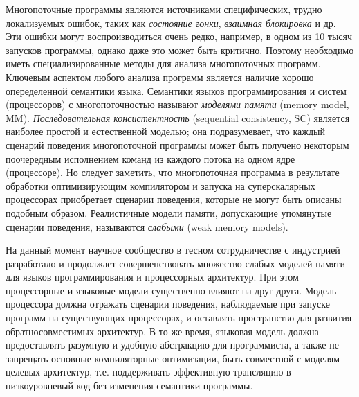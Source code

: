 
{\actuality}
Многопоточные программы являются источниками специфических,
трудно локализуемых ошибок,
таких как \emph{состояние гонки}, \emph{взаимная блокировка} и др.
Эти ошибки могут воспроизводиться очень редко, например, в одном из 10 тысяч запусков
программы, однако даже это может быть критично.
Поэтому необходимо иметь специализированные методы для анализа многопоточных программ.
Ключевым аспектом любого анализа программ является наличие хорошо опеределенной семантики языка.
Семантики языков программирования и систем (процессоров) с многопоточностью называют \emph{моделями памяти} (memory model, MM).
\emph{Последовательная консистентность} (sequential consistency, SC) является наиболее простой и естественной моделью;
она подразумевает, что каждый сценарий поведения многопоточной программы может быть
получено некоторым поочередным исполнением команд из каждого потока на одном ядре
(процессоре). Но следует заметить, что многопоточная программа в результате обработки оптимизирующим
компилятором и запуска на суперскалярных процессорах приобретает сценарии поведения,
которые не могут быть описаны подобным образом.
Реалистичные модели памяти, допускающие упомянутые сценарии поведения, называются \emph{слабыми} (weak memory models).

На данный момент научное сообщество в тесном сотрудничестве с индустрией
разработало и продолжает совершенствовать множество слабых моделей памяти для
языков программирования и процессорных архитектур.
При этом процессорные и языковые модели существенно влияют на друг друга.
Модель процессора должна отражать сценарии поведения, наблюдаемые при запуске программ
на существующих процессорах, и оставлять пространство для развития
обратносовместимых архитектур. В то же время, языковая модель должна
предоставлять разумную и удобную абстракцию для программиста, а также не запрещать основные
компиляторные оптимизации, быть совместной с моделям целевых архитектур,
т.е. поддерживать эффективную трансляцию в низкоуровневый код без изменения
семантики программы.

